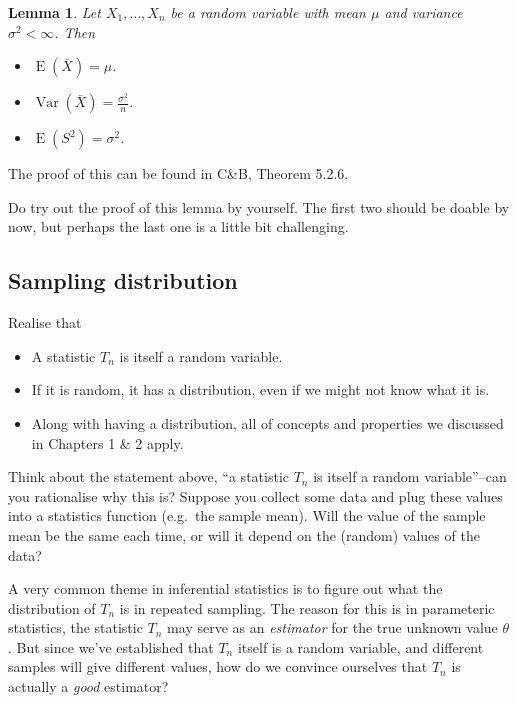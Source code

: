 \documentclass[
]{book}
\providecommand{\tightlist}{%
  \setlength{\itemsep}{0pt}\setlength{\parskip}{0pt}}
\DeclareMathOperator{\E}{E}
\DeclareMathOperator{\Var}{Var}
\newtheorem{lemma}{Lemma}[chapter]
\theoremstyle{definition}
\theoremstyle{definition}
\theoremstyle{definition}
\theoremstyle{definition}
\theoremstyle{remark}
\begin{document}
\begin{lemma}

Let \(X_1,\dots,X_n\) be a random variable with mean \(\mu\) and variance \(\sigma^2<\infty\). Then

\begin{itemize}
\tightlist
\item
  \(\E(\bar X) = \mu\).
\item
  \(\Var(\bar X) = \frac{\sigma^2}{n}\).
\item
  \(\E(S^2)=\sigma^2\).
\end{itemize}

\end{lemma}

The proof of this can be found in C\&B, Theorem 5.2.6.

Do try out the proof of this lemma by yourself.
The first two should be doable by now, but perhaps the last one is a little bit challenging.

\hypertarget{sampling-distribution}{%
\subsection{Sampling distribution}\label{sampling-distribution}}

Realise that

\begin{itemize}
\tightlist
\item
  A statistic \(T_n\) is itself a random variable.
\item
  If it is random, it has a distribution, even if we might not know what it is.
\item
  Along with having a distribution, all of concepts and properties we discussed in Chapters 1 \& 2 apply.
\end{itemize}

Think about the statement above, ``a statistic \(T_n\) is itself a random variable''--can you rationalise why this is? Suppose you collect some data and plug these values into a statistics function (e.g.~the sample mean). Will the value of the sample mean be the same each time, or will it depend on the (random) values of the data?

A very common theme in inferential statistics is to figure out what the distribution of \(T_n\) is in repeated sampling.
The reason for this is in parameteric statistics, the statistic \(T_n\) may serve as an \emph{estimator} for the true unknown value \(\theta\).
But since we've established that \(T_n\) itself is a random variable, and different samples will give different values, how do we convince ourselves that \(T_n\) is actually a \emph{good} estimator?
\end{document}
